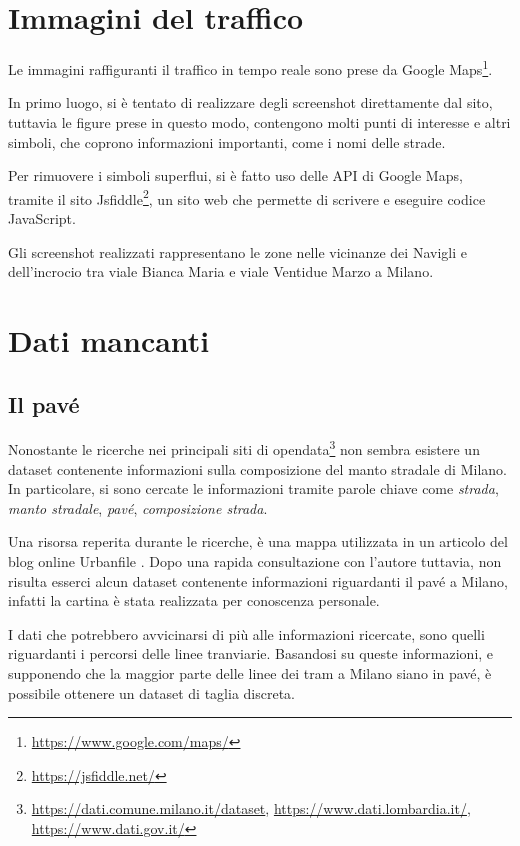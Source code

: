 \documentclass[a4paper]{report}
\newcommand{\quotestyle}[1]{\textit{#1}}
\begin{document}
\section{Immagini del traffico}

Le immagini raffiguranti il traffico in tempo reale sono prese da Google 
Maps\footnote{\url{https://www.google.com/maps/}}. 

In primo luogo, si è tentato di realizzare degli screenshot direttamente dal sito, 
tuttavia le figure prese in questo modo, contengono molti punti di interesse e altri simboli, 
che coprono informazioni importanti, come i nomi delle strade. 

Per rimuovere i simboli superflui, si è fatto uso delle API di Google Maps, 
tramite il sito Jsfiddle\footnote{\url{https://jsfiddle.net/}}, un sito web che permette di 
scrivere e eseguire codice JavaScript. 

Gli screenshot realizzati rappresentano le zone nelle vicinanze dei Navigli 
e dell'incrocio tra viale Bianca Maria e viale Ventidue Marzo a Milano. 

\section{Dati mancanti}

\subsection{Il pavé}

Nonostante le ricerche nei principali siti di 
opendata\footnote{
    \url{https://dati.comune.milano.it/dataset}, 
    \url{https://www.dati.lombardia.it/},
    \url{https://www.dati.gov.it/}}
non sembra esistere un dataset contenente informazioni sulla composizione del 
manto stradale di Milano. 
In particolare, si sono cercate le informazioni tramite parole chiave come 
\quotestyle{strada}, \quotestyle{manto stradale}, \quotestyle{pavé}, 
\quotestyle{composizione strada}. 

Una risorsa reperita durante le ricerche, è una mappa utilizzata in un articolo del blog online 
Urbanfile \cite{URBANFILE:1}. 
Dopo una rapida consultazione con l'autore tuttavia, non risulta esserci alcun 
dataset contenente informazioni riguardanti il pavé a Milano, infatti la cartina è 
stata realizzata per conoscenza personale. 

I dati che potrebbero avvicinarsi di più alle informazioni ricercate, 
sono quelli riguardanti i percorsi delle linee tranviarie. 
Basandosi su queste informazioni, e supponendo che la maggior parte delle linee dei 
tram a Milano siano in pavé, è possibile ottenere un dataset di taglia discreta. 
\end{document}

